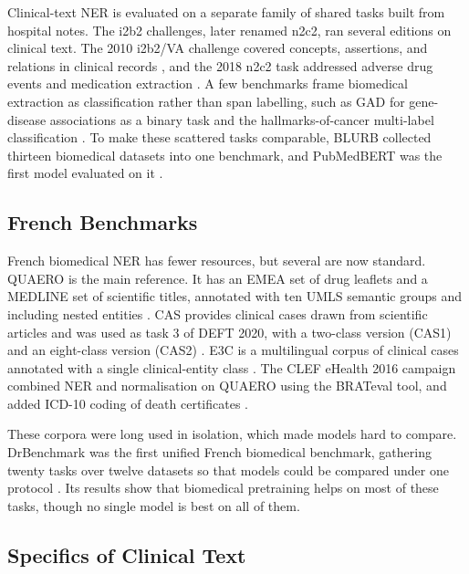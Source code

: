 Clinical-text NER is evaluated on a separate family of shared tasks built from hospital notes.
The i2b2 challenges, later renamed n2c2, ran several editions on clinical text. The 2010
i2b2/VA challenge covered concepts, assertions, and relations in clinical records
\citep{uzuner2011i2b2}, and the 2018 n2c2 task addressed adverse drug events and medication
extraction \citep{henry2020n2c2}. A few benchmarks frame biomedical extraction as
classification rather than span labelling, such as GAD for gene-disease associations as a
binary task \citep{bravo2015gad} and the hallmarks-of-cancer multi-label classification
\citep{baker2016hallmarks}. To make these scattered tasks comparable, BLURB collected thirteen
biomedical datasets into one benchmark, and PubMedBERT was the first model evaluated on it
\citep{gu_domain-specific_2022}.

\subsection{French Benchmarks}

French biomedical NER has fewer resources, but several are now standard. QUAERO is the main
reference. It has an EMEA set of drug leaflets and a MEDLINE set of scientific titles, annotated
with ten UMLS semantic groups and including nested entities \citep{neveol14quaero}. CAS
provides clinical cases drawn from scientific articles and was used as task 3 of DEFT 2020,
with a two-class version (CAS1) and an eight-class version (CAS2) \citep{cardon_presentation_2020}.
E3C is a multilingual corpus of clinical cases annotated with a single clinical-entity class
\citep{magnini_e3c_2021}. The CLEF eHealth 2016 campaign combined NER and normalisation on
QUAERO using the BRATeval tool, and added ICD-10 coding of death certificates
\citep{neveol_clinical_2016}.

These corpora were long used in isolation, which made models hard to compare. DrBenchmark
was the first unified French biomedical benchmark, gathering twenty tasks over twelve datasets
so that models could be compared under one protocol \citep{drbenchmark2024}. Its results
show that biomedical pretraining helps on most of these tasks, though no single model is best
on all of them.

\subsection{Specifics of Clinical Text}

